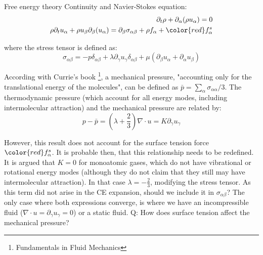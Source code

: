 \documentclass[8pt]{beamer}
\newcommand{\kronecker}{\delta_{\alpha \beta}}
\begin{document}
	\begin{frame}[t]{Free energy theory}
		Continuity and Navier-Stokes equation:
		\begin{equation*}
			\begin{split}
			\partial_t \rho + \partial_\alpha (\rho u_\alpha) = 0\\
			\rho \partial_t u_\alpha  + \rho u_\beta \partial_\beta (u_\alpha) = \partial_\beta \sigma_{\alpha\beta} + \rho f_\alpha +  \color{red} f^s_\alpha
			\end{split}
		\end{equation*}
		
	where the stress tensor is defined as:
	\begin{equation*}
			\sigma_{\alpha\beta} = -p \kronecker + \lambda \partial_\gamma u_\gamma \kronecker + \mu (\partial_\beta u_\alpha + \partial_\alpha u_\beta)
	\end{equation*}
	
	According with Currie's book \footnote{Fundamentals in Fluid Mechanics}, a mechanical pressure, "accounting only for the translational energy of the molecules", can be defined as $\bar{p} = \sum_\alpha \sigma_{\alpha\alpha} /3$. The thermodynamic pressure (which account for all energy modes, including intermolecular attraction) and the mechanical pressure are related by:
	\begin{equation*}
		p - \bar{p} = (\lambda + \frac{2}{3}) \nabla \cdot u = K  \partial_\gamma u_\gamma
	\end{equation*}
	
	However, this result does not account for the surface tension force $\color{red} f^s_\alpha$. It is probable then, that this relationship needs to be redefined. It is argued that $K=0$ for monoatomic gases, which do not have vibrational or rotational energy modes (although they do not claim that they still may have intermolecular attraction). In that case $\lambda = -\frac{2}{3}$, modifying the stress tensor. As this term did not arise in the CE expansion, should we include it in $\sigma_{\alpha\beta}$? The only case where both expressions converge, is where we have an incompressible fluid ($\nabla \cdot u = \partial_\gamma u_\gamma = 0 $) or a static fluid. Q: \color{red} How does surface tension affect the mechanical pressure?
	
	\end{frame}
	
\end{document}

